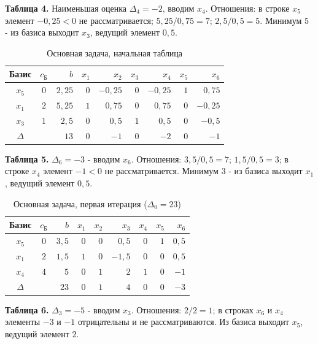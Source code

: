 \documentclass[a4paper,12pt]{article}
\begin{document}
\textbf{Таблица 4.} Наименьшая оценка $\Delta_4 = -2$, вводим $x_4$. Отношения: в строке $x_5$ элемент $-0{,}25 < 0$ не рассматривается; $5{,}25/0{,}75 = 7$; $2{,}5/0{,}5 = 5$. Минимум $5$ - из базиса выходит $x_3$, ведущий элемент $0{,}5$.

\begin{table}[H]
\centering\small
\caption{Основная задача, начальная таблица}
\begin{tabular}{|c|c|r|r|r|r|r|r|r|}
\hline
Базис & $c_{\text{Б}}$ & $b$ & $x_{1}$ & $x_{2}$ & $x_{3}$ & $x_{4}$ & $x_{5}$ & $x_{6}$ \\ \hline
$x_{5}$ & $0$ & $2{,}25$ & $0$ & $-0{,}25$ & $0$ & $-0{,}25$ & $1$ & $0{,}75$ \\
$x_{1}$ & $2$ & $5{,}25$ & $1$ & $0{,}75$ & $0$ & $0{,}75$ & $0$ & $-0{,}25$ \\
$x_{3}$ & $1$ & $2{,}5$ & $0$ & $0{,}5$ & $1$ & $\boxed{0{,}5}$ & $0$ & $-0{,}5$ \\
\hline
$\Delta$ & & $13$ & $0$ & $-1$ & $0$ & $-2$ & $0$ & $-1$ \\ \hline
\end{tabular}
\end{table}

\textbf{Таблица 5.} $\Delta_6 = -3$ - вводим $x_6$. Отношения: $3{,}5/0{,}5 = 7$; $1{,}5/0{,}5 = 3$; в строке $x_4$ элемент $-1 < 0$ не рассматривается. Минимум $3$ - из базиса выходит $x_1$, ведущий элемент $0{,}5$.

\begin{table}[H]
\centering\small
\caption{Основная задача, первая итерация ($\Delta_0 = 23$)}
\begin{tabular}{|c|c|r|r|r|r|r|r|r|}
\hline
Базис & $c_{\text{Б}}$ & $b$ & $x_{1}$ & $x_{2}$ & $x_{3}$ & $x_{4}$ & $x_{5}$ & $x_{6}$ \\ \hline
$x_{5}$ & $0$ & $3{,}5$ & $0$ & $0$ & $0{,}5$ & $0$ & $1$ & $0{,}5$ \\
$x_{1}$ & $2$ & $1{,}5$ & $1$ & $0$ & $-1{,}5$ & $0$ & $0$ & $\boxed{0{,}5}$ \\
$x_{4}$ & $4$ & $5$ & $0$ & $1$ & $2$ & $1$ & $0$ & $-1$ \\
\hline
$\Delta$ & & $23$ & $0$ & $1$ & $4$ & $0$ & $0$ & $-3$ \\ \hline
\end{tabular}
\end{table}

\textbf{Таблица 6.} $\Delta_3 = -5$ - вводим $x_3$. Отношения: $2/2 = 1$; в строках $x_6$ и $x_4$ элементы $-3$ и $-1$ отрицательны и не рассматриваются. Из базиса выходит $x_5$, ведущий элемент $2$.
\end{document}
